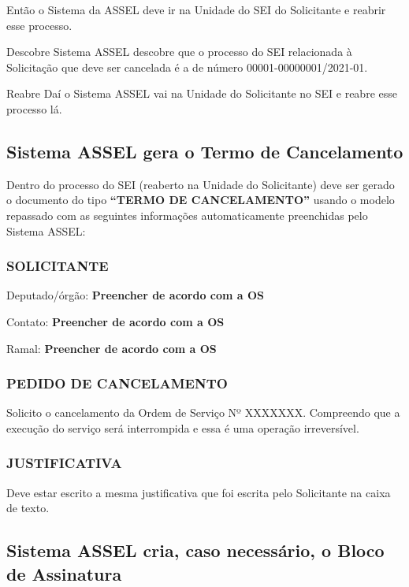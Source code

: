 Então o Sistema da ASSEL deve ir na Unidade do SEI do Solicitante e reabrir esse processo.

\begin{exemplo}[1]{Descobre}
	Sistema ASSEL descobre que o processo do SEI relacionada à Solicitação que deve ser cancelada é a de número 00001-00000001/2021-01.
\end{exemplo}

\begin{exemplo}[1]{Reabre}
	Daí o Sistema ASSEL vai na Unidade do Solicitante no SEI e reabre esse processo lá.
\end{exemplo}


\subsection{Sistema ASSEL gera o Termo de Cancelamento}

Dentro do processo do SEI (reaberto na Unidade do Solicitante) deve ser gerado o documento do tipo \textbf{``TERMO DE CANCELAMENTO''} usando o modelo repassado com as seguintes informações automaticamente preenchidas pelo Sistema ASSEL:

\subsubsection{SOLICITANTE}

Deputado/órgão: \textbf{Preencher de acordo com a OS}

Contato:  \textbf{Preencher de acordo com a OS}

Ramal:  \textbf{Preencher de acordo com a OS}

\subsubsection{PEDIDO DE CANCELAMENTO}

Solicito o cancelamento da Ordem de Serviço Nº XXXXXXX. Compreendo que a execução do
serviço será interrompida e essa é uma operação irreversível.

\subsubsection{JUSTIFICATIVA}

Deve estar escrito a mesma justificativa que foi escrita pelo Solicitante na caixa de texto. 

\subsection{Sistema ASSEL cria, caso necessário, o Bloco de Assinatura}	


